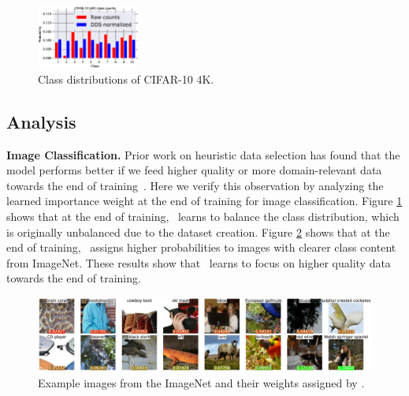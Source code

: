 
\begin{figure}
  \centering
    \includegraphics[width=0.3\textwidth]{figs/cifar10_dds.eps}
  \caption{\label{fig:dds_distribution}Class distributions of CIFAR-10 4K.}
\end{figure}

\subsection{Analysis}
\textbf{Image Classification.}
 Prior work on heuristic data selection has found that the model performs better if we feed higher quality or more domain-relevant data  towards the end of training~\citep{dynamic_data_selection_nmt,dynamic}. Here we verify this observation by analyzing the learned importance weight at the end of training for image classification. Figure \ref{fig:dds_distribution} shows that at the end of training, \dds~learns to balance the class distribution, which is originally unbalanced due to the dataset creation. Figure \ref{fig:dds_score} shows that at the end of training, \dds~assigns higher probabilities to images with clearer class content from ImageNet. These results show that \dds~learns to focus on higher quality data towards the end of training.  

\begin{figure}
    \includegraphics[width=\textwidth]{figs/imagenet_dds.eps}
  \caption{\label{fig:dds_score} Example images from the ImageNet and their weights assigned by \dds. }
\end{figure}


